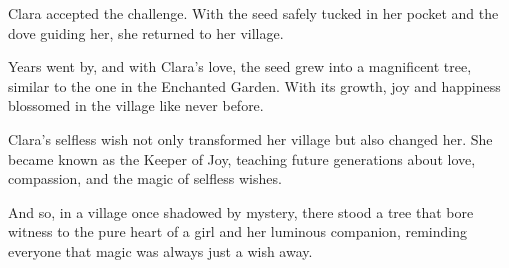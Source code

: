 \documentclass[10pt, a4paper, titlepage]{article}
\begin{document}
Clara accepted the challenge. With the seed safely tucked in her pocket and the dove guiding her, she returned to her village.

Years went by, and with Clara's love, the seed grew into a magnificent tree, similar to the one in the Enchanted Garden. With its growth, joy and happiness blossomed in the village like never before.

Clara's selfless wish not only transformed her village but also changed her. She became known as the Keeper of Joy, teaching future generations about love, compassion, and the magic of selfless wishes.

And so, in a village once shadowed by mystery, there stood a tree that bore witness to the pure heart of a girl and her luminous companion, reminding everyone that magic was always just a wish away.
\end{document}
